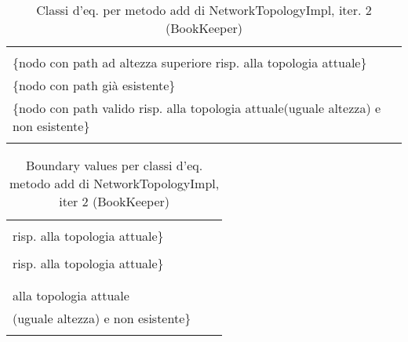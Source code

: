 \documentclass[10pt, a4paper]{article}
\newcommand{\Intmaketable}[4]{
	\begin{longtable}{#3}
	#4
	\caption{#2}
	\label{#1}
	\end{longtable}
}
\newcommand{\Intceqtable}[3]{
	\Intmaketable{#1}{#2}{|l|l|}{
	\hline
	\thead{Parametro formale} & \thead{Classi d'equivalenza} \\
	\hline
	\hline
	#3
	\hline}
}
\newcommand{\Intbvtable}[3]{
	\Intmaketable{#1}{#2}{|l|l|l|}{
	\hline
	\thead{Parametro formale} & \thead{Classe d'equivalenza} & \thead{Boundary value}\\
	\hline
	\hline
	#3
	\hline}
}
\newcommand{\Intceqcaption}[4]{Classi d'eq. per metodo #1 di #2, iter. #3 (#4)}
\newcommand{\Intbvcaption}[4]{Boundary values per classi d'eq. metodo #1 di #2, iter #3 (#4)}
\newcommand{\gettablelabel}[5]{table:#1:#2:#3:iter#4:proj#5}
\newcommand{\ceqtable}[5]{
	\Intceqtable{\gettablelabel{ceq}{#1}{#2}{#3}{#4}}
		{\Intceqcaption{#1}{#2}{#3}{#4}}
		{#5}
}
\newcommand{\bvtable}[5]{
	\Intbvtable{\gettablelabel{bv}{#1}{#2}{#3}{#4}}
		{\Intbvcaption{#1}{#2}{#3}{#4}}
		{#5}
}
\newcommand{\tcell}{\makecell[tl]}
\newcommand{\newtrow}{\\ \hline}
\def\bookkeeper{BookKeeper}
\newcommand{\ceq}[1]{\{#1\}}
\begin{document}
	
	\ceqtable{add}{NetworkTopologyImpl}{2}{\bookkeeper}{
			\tcell{node} & \tcell{
									\ceq{nodo con path ad altezza inferiore risp. alla topologia attuale} \\
									\ceq{nodo con path ad altezza superiore risp. alla topologia attuale} \\
									\ceq{nodo con path già esistente} \\
									\ceq{nodo con path valido risp. alla topologia attuale(uguale altezza) e non esistente}
								}
		\newtrow
	}
	
	\bvtable{add}{NetworkTopologyImpl}{2}{\bookkeeper}{
			\tcell{node} & 
			\tcell{\ceq{nodo con path ad altezza inferiore\\ risp. alla topologia attuale}} &
			\tcell{Node("/rack-1/bookie-1")}
		\newtrow
			\tcell{node} &
			\tcell{\ceq{nodo con path ad altezza superiore\\ risp. alla topologia attuale}} &
			\tcell{Node("/region-1/dc-1/rack-1/bookie-1")}
		\newtrow
			\tcell{node} &
			\tcell{\ceq{nodo con path già esistente}} &
			\tcell{Node("/dc-1/rack-1/bookie-1")}
		\newtrow
			\tcell{node} &
			\tcell{\ceq{nodo con path valido risp.\\ alla topologia attuale\\(uguale altezza) e non esistente}} &
			\tcell{Node("/dc-3/rack-4/bookie-7")}
		\newtrow
	}
	
\end{document}

